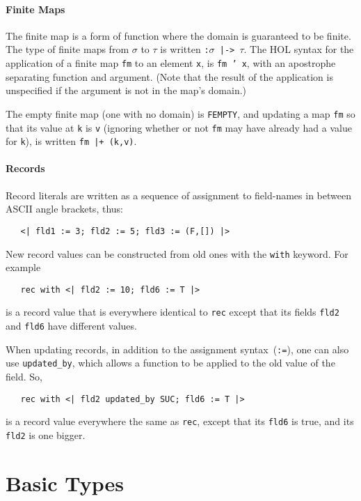\documentclass[11pt]{article}
\begin{document}
\paragraph{Finite Maps} The finite map is a form of function where the
domain is guaranteed to be finite.  The type of finite maps from
$\sigma$ to $\tau$ is written \texttt{:$\sigma$~|->~$\tau$}.  The HOL
syntax for the application of a finite map \texttt{fm} to an element
\texttt{x}, is \texttt{fm~'~x}, with an apostrophe separating
function and argument.  (Note that the result of the application is
unspecified if the argument is not in the map's domain.)

The empty finite map (one with no domain) is \texttt{FEMPTY}, and
updating a map \texttt{fm} so that its value at \texttt{k} is
\texttt{v} (ignoring whether or not \texttt{fm} may have already had a
value for \texttt{k}), is written \texttt{fm |+ (k,v)}.

\paragraph{Records}
Record literals are written as a sequence of assignment to field-names
in between ASCII angle brackets, thus:
\begin{verbatim}
   <| fld1 := 3; fld2 := 5; fld3 := (F,[]) |>
\end{verbatim}
New record values can be constructed from old ones with the
\texttt{with} keyword.  For example
\begin{verbatim}
   rec with <| fld2 := 10; fld6 := T |>
\end{verbatim}
is a record value that is everywhere identical to \texttt{rec} except
that its fields \texttt{fld2} and \texttt{fld6} have different
values.

When updating records, in addition to the assignment
syntax~(\texttt{:=}), one can also use \texttt{updated_by}, which
allows a function to be applied to the old value of the field.  So,
\begin{verbatim}
   rec with <| fld2 updated_by SUC; fld6 := T |>
\end{verbatim}
is a record value everywhere the same as \texttt{rec}, except that its
\texttt{fld6} is true, and its \texttt{fld2} is one bigger.

\section{Basic Types}
\label{sec:basic-types}
\end{document}
